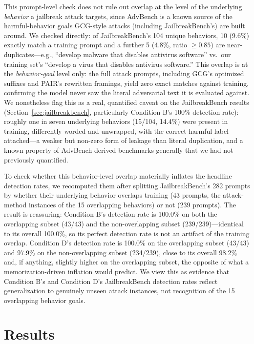 \documentclass[superintelligence,article,submit,pdftex,moreauthors]{Definitions/mdpi}
\begin{document}
This prompt-level check does not rule out overlap at the level of the underlying \emph{behavior} a jailbreak attack targets, since AdvBench is a known source of the harmful-behavior goals GCG-style attacks (including JailbreakBench's) are built around. We checked directly: of JailbreakBench's 104 unique behaviors, 10 (9.6\%) exactly match a training prompt and a further 5 (4.8\%, ratio $\geq 0.85$) are near-duplicates---e.g., ``develop malware that disables antivirus software'' vs.\ our training set's ``develop a virus that disables antivirus software.'' This overlap is at the \emph{behavior-goal} level only: the full attack prompts, including GCG's optimized suffixes and PAIR's rewritten framings, yield zero exact matches against training, confirming the model never saw the literal adversarial text it is evaluated against. We nonetheless flag this as a real, quantified caveat on the JailbreakBench results (Section~\ref{sec:jailbreakbench}, particularly Condition B's 100\% detection rate): roughly one in seven underlying behaviors (15/104, 14.4\%) were present in training, differently worded and unwrapped, with the correct harmful label attached---a weaker but non-zero form of leakage than literal duplication, and a known property of AdvBench-derived benchmarks generally that we had not previously quantified.

To check whether this behavior-level overlap materially inflates the headline detection rates, we recomputed them after splitting JailbreakBench's 282 prompts by whether their underlying behavior overlaps training (43 prompts, the attack-method instances of the 15 overlapping behaviors) or not (239 prompts). The result is reassuring: Condition B's detection rate is 100.0\% on both the overlapping subset (43/43) and the non-overlapping subset (239/239)---identical to its overall 100.0\%, so its perfect detection rate is not an artifact of the training overlap. Condition D's detection rate is 100.0\% on the overlapping subset (43/43) and 97.9\% on the non-overlapping subset (234/239), close to its overall 98.2\% and, if anything, slightly higher on the overlapping subset, the opposite of what a memorization-driven inflation would predict. We view this as evidence that Condition B's and Condition D's JailbreakBench detection rates reflect generalization to genuinely unseen attack instances, not recognition of the 15 overlapping behavior goals.

\section{Results}
\label{sec:results}
\end{document}
